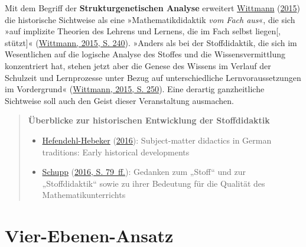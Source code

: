 \documentclass[
  ngerman,
]{scrbook}
\providecommand{\tightlist}{%
  \setlength{\itemsep}{0pt}\setlength{\parskip}{0pt}}
\theoremstyle{definition}
\theoremstyle{definition}
\theoremstyle{definition}
\theoremstyle{definition}
\theoremstyle{remark}
\begin{document}
Mit dem Begriff der \textbf{Strukturgenetischen Analyse} erweitert \protect\hyperlink{ref-Wittmann:2015}{Wittmann} (\protect\hyperlink{ref-Wittmann:2015}{2015}) die historische Sichtweise als eine »Mathematikdidaktik \emph{vom Fach aus}«, die sich »auf implizite Theorien des Lehrens und Lernens, die im Fach selbst liegen{[}, stützt{]}« (\protect\hyperlink{ref-Wittmann:2015}{Wittmann, 2015, S. 240}). »Anders als bei der Stoffdidaktik, die sich im Wesentlichen auf die logische Analyse des Stoffes und die Wissensvermittlung konzentriert hat, stehen jetzt aber die Genese des Wissens im Verlauf der Schulzeit und Lernprozesse unter Bezug auf unterschiedliche Lernvoraussetzungen im Vordergrund« (\protect\hyperlink{ref-Wittmann:2015}{Wittmann, 2015, S. 250}). Eine derartig ganzheitliche Sichtweise soll auch den Geist dieser Veranstaltung ausmachen.

\begin{quote}
\textbf{Überblicke zur historischen Entwicklung der Stoffdidaktik}

\begin{itemize}
\tightlist
\item
  \protect\hyperlink{ref-Hefendehl-Hebeker:2016}{Hefendehl-Hebeker} (\protect\hyperlink{ref-Hefendehl-Hebeker:2016}{2016}): Subject-matter didactics in German traditions: Early historical developments
\item
  \protect\hyperlink{ref-Schupp:2016}{Schupp} (\protect\hyperlink{ref-Schupp:2016}{2016, S. 79~ff.}): Gedanken zum „Stoff`` und zur „Stoffdidaktik`` sowie zu ihrer Bedeutung für die Qualität des Mathematikunterrichts
\end{itemize}
\end{quote}

\hypertarget{vier-ebenen-ansatz}{%
\chapter{Vier-Ebenen-Ansatz}\label{vier-ebenen-ansatz}}
\end{document}
